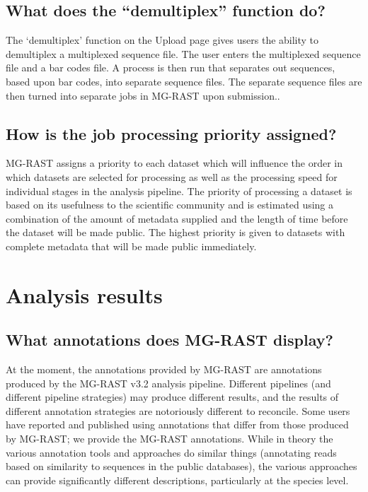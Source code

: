\documentclass[letterpaper,10pt,english]{sphinxmanual}
\begin{document}
\subsection{What does the “demultiplex” function do?}
\label{\detokenize{user_manual:what-does-the-demultiplex-function-do}}
The ‘demultiplex’ function on the Upload page gives users the ability to
demultiplex a multiplexed sequence file. The user enters the multiplexed
sequence file and a bar codes file. A process is then run that separates
out sequences, based upon bar codes, into separate sequence files. The
separate sequence files are then turned into separate jobs in MG-RAST
upon submission..


\subsection{How is the job processing priority assigned?}
\label{\detokenize{user_manual:how-is-the-job-processing-priority-assigned-1}}\label{\detokenize{user_manual:id6}}
MG-RAST assigns a priority to each dataset which will influence the
order in which datasets are selected for processing as well as the
processing speed for individual stages in the analysis pipeline. The
priority of processing a dataset is based on its usefulness to the
scientific community and is estimated using a combination of the amount
of metadata supplied and the length of time before the dataset will be
made public. The highest priority is given to datasets with complete
metadata that will be made public immediately.


\section{Analysis results}
\label{\detokenize{user_manual:analysis-results}}

\subsection{What annotations does MG-RAST display?}
\label{\detokenize{user_manual:what-annotations-does-mg-rast-display}}
At the moment, the annotations provided by MG-RAST are annotations
produced by the MG-RAST v3.2 analysis pipeline. Different pipelines (and
different pipeline strategies) may produce different results, and the
results of different annotation strategies are notoriously different to
reconcile. Some users have reported and published using annotations that
differ from those produced by MG-RAST; we provide the MG-RAST
annotations. While in theory the various annotation tools and approaches
do similar things (annotating reads based on similarity to sequences in
the public databases), the various approaches can provide significantly
different descriptions, particularly at the species level.
\end{document}

